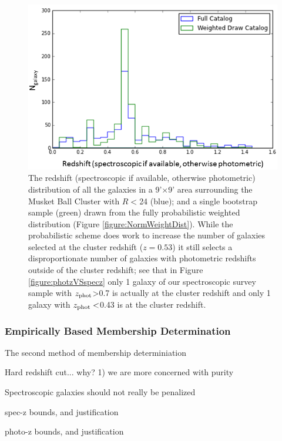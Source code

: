 \begin{figure}
\centering
\includegraphics[width=5in]{Chapter4/AnalysisFiles/zdist_randomweightdraw_reformat.png}
\caption[Comparison of parent galaxy redshift distribution with weighted random draw distribution.]{
The redshift (spectroscopic if available, otherwise photometric) distribution of all the galaxies in a 9'$\times$9' area surrounding the Musket Ball Cluster with $R<$24 (blue); and a single bootstrap sample (green) drawn from the fully probabilistic weighted distribution (Figure \ref{figure:NormWeightDist}).
While the probabilistic scheme does work to increase the number of galaxies selected at the cluster redshift ($z=0.53$) it still selects a disproportionate number of galaxies with photometric redshifts outside of the cluster redshift; see that in Figure \ref{figure:photzVSspecz} only 1 galaxy of our spectroscopic survey sample with $z_{\rm phot}$>0.7 is actually at the cluster redshift and only 1 galaxy with $z_{\rm phot}<$0.43 is at the cluster redshift.
}
\label{figure:ProbWeightDist}
\end{figure}


\subsubsection{Empirically Based Membership Determination}

The second method of membership determiniation

Hard redshift cut... why? 1) we are more concerned with purity 

Spectroscopic galaxies should not really be penalized 


spec-z bounds, and justification

photo-z bounds, and justification

